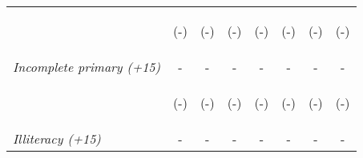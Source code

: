 \begin{tabular}{lccccccc}
\vspace{4pt} & \begin{footnotesize}(-)\end{footnotesize} &  \begin{footnotesize}(-)\end{footnotesize}  &  \begin{footnotesize}(-)\end{footnotesize}    &   \begin{footnotesize}(-)\end{footnotesize}   &   \begin{footnotesize}(-)\end{footnotesize}  &  \begin{footnotesize}(-)\end{footnotesize} &  \begin{footnotesize}(-)\end{footnotesize} \\          



\textit{Incomplete primary (+15)}          		  &  -    &    -   &     -  &  -  &     -  & -   &  -    \\

\vspace{4pt} & \begin{footnotesize}(-)\end{footnotesize} &  \begin{footnotesize}(-)\end{footnotesize}  &  \begin{footnotesize}(-)\end{footnotesize}    &   \begin{footnotesize}(-)\end{footnotesize}   &   \begin{footnotesize}(-)\end{footnotesize}  &  \begin{footnotesize}(-)\end{footnotesize} &  \begin{footnotesize}(-)\end{footnotesize} \\          



\textit{Illiteracy (+15)}          		  &  -    &    -   &     -  &  -  &     -  & -   &  -    \\


\end{tabular}

